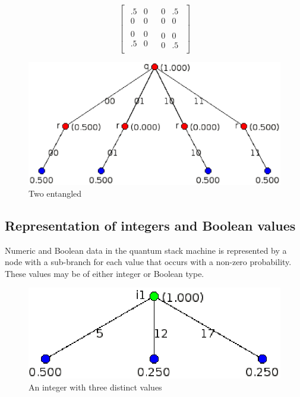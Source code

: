 {\begin{singlespace}
\[\left[
\begin{array}{c|c}
\begin{array}{cc}
.5&0\\0&0
\end{array} &
\begin{array}{cc}
0&.5\\0&0
\end{array}\\
\hline
\begin{array}{cc}
0&0\\.5&0\\
\end{array} &
\begin{array}{cc}
0&0\\0&.5
\end{array}
\end{array}\right]
\]
\end{singlespace}
}

\begin{figure}[htbp]
\centerline{
\includegraphics[scale=0.6]{images/entangledQubits.eps}
}
\caption{Two entangled \qubits}\label{fig:entangled}
\end{figure}

\subsection{Representation of integers and Boolean values}\label{subsec:representclassicaldata}
Numeric and Boolean
 data in the quantum stack machine is represented by a node with
a sub-branch for each value that occurs with a non-zero probability. 
These values may be of either integer or Boolean type.

\begin{figure}[htbp]
\centerline{
\includegraphics[scale=.6]{images/integer.eps}
}
\caption{An integer with three distinct values}\label{fig:integerofthree}
\end{figure}

